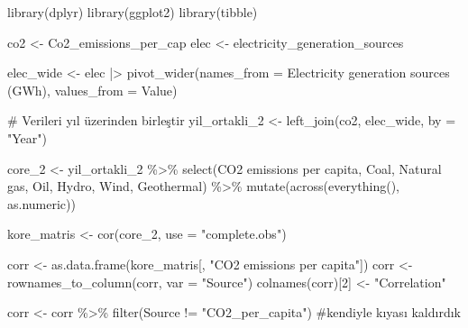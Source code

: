 \documentclass[
  letterpaper,
  DIV=11,
  numbers=noendperiod]{scrartcl}
\newenvironment{Shaded}{\begin{snugshade}}{\end{snugshade}}
\newcommand{\AttributeTok}[1]{\textcolor[rgb]{0.40,0.45,0.13}{#1}}
\newcommand{\CommentTok}[1]{\textcolor[rgb]{0.37,0.37,0.37}{#1}}
\newcommand{\DecValTok}[1]{\textcolor[rgb]{0.68,0.00,0.00}{#1}}
\newcommand{\FunctionTok}[1]{\textcolor[rgb]{0.28,0.35,0.67}{#1}}
\newcommand{\NormalTok}[1]{\textcolor[rgb]{0.00,0.23,0.31}{#1}}
\newcommand{\OtherTok}[1]{\textcolor[rgb]{0.00,0.23,0.31}{#1}}
\newcommand{\SpecialCharTok}[1]{\textcolor[rgb]{0.37,0.37,0.37}{#1}}
\newcommand{\StringTok}[1]{\textcolor[rgb]{0.13,0.47,0.30}{#1}}
\begin{document}
\begin{Shaded}
\begin{Highlighting}[]
\FunctionTok{library}\NormalTok{(dplyr)}
\FunctionTok{library}\NormalTok{(ggplot2)}
\FunctionTok{library}\NormalTok{(tibble)}

\NormalTok{co2 }\OtherTok{\textless{}{-}}\NormalTok{ Co2\_emissions\_per\_cap}
\NormalTok{elec }\OtherTok{\textless{}{-}}\NormalTok{ electricity\_generation\_sources}

\NormalTok{elec\_wide }\OtherTok{\textless{}{-}}\NormalTok{ elec }\SpecialCharTok{|\textgreater{}}
  \FunctionTok{pivot\_wider}\NormalTok{(}\AttributeTok{names\_from =} \StringTok{\textasciigrave{}}\AttributeTok{Electricity generation sources (GWh)}\StringTok{\textasciigrave{}}\NormalTok{,}
              \AttributeTok{values\_from =}\NormalTok{ Value)}

\CommentTok{\# Verileri yıl üzerinden birleştir}
\NormalTok{yil\_ortakli\_2 }\OtherTok{\textless{}{-}} \FunctionTok{left\_join}\NormalTok{(co2, elec\_wide, }\AttributeTok{by =} \StringTok{"Year"}\NormalTok{)}

\NormalTok{core\_2 }\OtherTok{\textless{}{-}}\NormalTok{ yil\_ortakli\_2 }\SpecialCharTok{\%\textgreater{}\%}
  \FunctionTok{select}\NormalTok{(}\StringTok{\textasciigrave{}}\AttributeTok{CO2 emissions per capita}\StringTok{\textasciigrave{}}\NormalTok{, Coal, }\StringTok{\textasciigrave{}}\AttributeTok{Natural gas}\StringTok{\textasciigrave{}}\NormalTok{, Oil, Hydro, Wind, Geothermal) }\SpecialCharTok{\%\textgreater{}\%}
  \FunctionTok{mutate}\NormalTok{(}\FunctionTok{across}\NormalTok{(}\FunctionTok{everything}\NormalTok{(), as.numeric))}

\NormalTok{kore\_matris }\OtherTok{\textless{}{-}} \FunctionTok{cor}\NormalTok{(core\_2, }\AttributeTok{use =} \StringTok{"complete.obs"}\NormalTok{)}

\NormalTok{corr }\OtherTok{\textless{}{-}} \FunctionTok{as.data.frame}\NormalTok{(kore\_matris[, }\StringTok{"CO2 emissions per capita"}\NormalTok{])}
\NormalTok{corr }\OtherTok{\textless{}{-}} \FunctionTok{rownames\_to\_column}\NormalTok{(corr, }\AttributeTok{var =} \StringTok{"Source"}\NormalTok{)}
\FunctionTok{colnames}\NormalTok{(corr)[}\DecValTok{2}\NormalTok{] }\OtherTok{\textless{}{-}} \StringTok{"Correlation"}


\NormalTok{corr }\OtherTok{\textless{}{-}}\NormalTok{ corr }\SpecialCharTok{\%\textgreater{}\%} \FunctionTok{filter}\NormalTok{(Source }\SpecialCharTok{!=} \StringTok{"CO2\_per\_capita"}\NormalTok{) }\CommentTok{\#kendiyle kıyası kaldırdık}


\end{Highlighting}
\end{Shaded}
\end{document}
